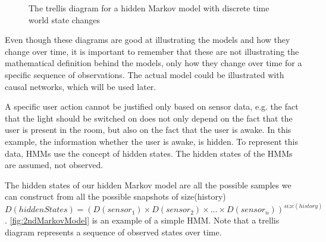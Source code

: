 \begin{figure}[htbp]
\centering
{}
\caption[Trellis diagram for a simple Markov model]{The trellis diagram for a hidden Markov model with discrete time world state changes}\label{fig:1stMarkovModel}
\end{figure}

Even though these diagrams are good at illustrating the models and how they change over time, it is important to remember that these are not illustrating the mathematical definition behind the models, only how they change over time for a specific sequence of observations. The actual model could be illustrated with causal networks, which will be used later.

A specific user action cannot be justified only based on sensor data, e.g. the fact that the light should be switched on does not only depend on the fact that the user is present in the room, but also on the fact that the user is awake. In this example, the information whether the user is awake, is hidden. To represent this data, HMMs use the concept of hidden states. The hidden states of the HMMs are assumed, not observed.

The hidden states of our hidden Markov model are all the possible samples we can construct from all the possible snapshots of size(history)
$D(hiddenStates) = (D(sensor_1)\times D(sensor_2)\times ... \times D(sensor_n))^{size(history)}$. \cref{fig:2ndMarkovModel} is an example of a simple HMM. Note that a trellis diagram represents a sequence of observed states over time.

